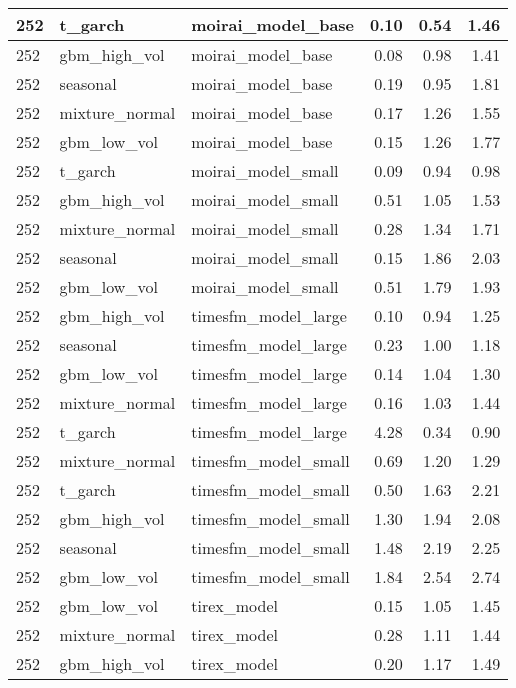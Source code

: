 {\begin{tabular}{lllrrr}
\midrule
252 & t\_garch & moirai\_model\_base & 0.10 & 0.54 & 1.46 \\
\midrule
252 & gbm\_high\_vol & moirai\_model\_base & 0.08 & 0.98 & 1.41 \\
\midrule
252 & seasonal & moirai\_model\_base & 0.19 & 0.95 & 1.81 \\
\midrule
252 & mixture\_normal & moirai\_model\_base & 0.17 & 1.26 & 1.55 \\
\midrule
252 & gbm\_low\_vol & moirai\_model\_base & 0.15 & 1.26 & 1.77 \\
\midrule
252 & t\_garch & moirai\_model\_small & 0.09 & 0.94 & 0.98 \\
\midrule
252 & gbm\_high\_vol & moirai\_model\_small & 0.51 & 1.05 & 1.53 \\
\midrule
252 & mixture\_normal & moirai\_model\_small & 0.28 & 1.34 & 1.71 \\
\midrule
252 & seasonal & moirai\_model\_small & 0.15 & 1.86 & 2.03 \\
\midrule
252 & gbm\_low\_vol & moirai\_model\_small & 0.51 & 1.79 & 1.93 \\
\midrule
252 & gbm\_high\_vol & timesfm\_model\_large & 0.10 & 0.94 & 1.25 \\
\midrule
252 & seasonal & timesfm\_model\_large & 0.23 & 1.00 & 1.18 \\
\midrule
252 & gbm\_low\_vol & timesfm\_model\_large & 0.14 & 1.04 & 1.30 \\
\midrule
252 & mixture\_normal & timesfm\_model\_large & 0.16 & 1.03 & 1.44 \\
\midrule
252 & t\_garch & timesfm\_model\_large & 4.28 & 0.34 & 0.90 \\
\midrule
252 & mixture\_normal & timesfm\_model\_small & 0.69 & 1.20 & 1.29 \\
\midrule
252 & t\_garch & timesfm\_model\_small & 0.50 & 1.63 & 2.21 \\
\midrule
252 & gbm\_high\_vol & timesfm\_model\_small & 1.30 & 1.94 & 2.08 \\
\midrule
252 & seasonal & timesfm\_model\_small & 1.48 & 2.19 & 2.25 \\
\midrule
252 & gbm\_low\_vol & timesfm\_model\_small & 1.84 & 2.54 & 2.74 \\
\midrule
252 & gbm\_low\_vol & tirex\_model & 0.15 & 1.05 & 1.45 \\
\midrule
252 & mixture\_normal & tirex\_model & 0.28 & 1.11 & 1.44 \\
\midrule
252 & gbm\_high\_vol & tirex\_model & 0.20 & 1.17 & 1.49 \\

\end{tabular}}
